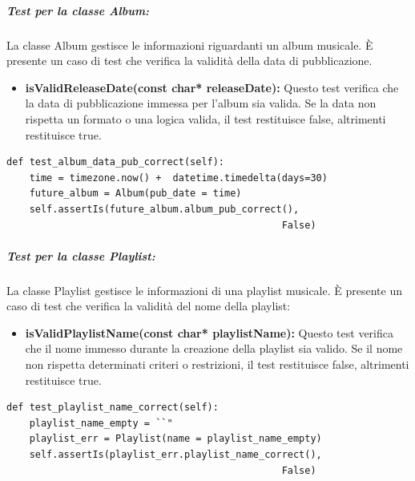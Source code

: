 \vspace{3pt}
\subparagraph{Test per la classe \textbf{Album:}} La classe Album gestisce le informazioni riguardanti un album musicale. È presente un caso di test che verifica la validità della data di pubblicazione.
\vspace{2pt}
\begin{itemize}
    \item \textbf{isValidReleaseDate(const char* releaseDate):}
    Questo test verifica che la data di pubblicazione immessa per l'album sia valida. Se la data non rispetta un formato o una logica valida, il test restituisce false, altrimenti restituisce true.
\end{itemize}

\vspace{2pt}
\begin{lstlisting}[caption={class AlbumModelTests(TestCase)}, captionpos=b]
def test_album_data_pub_correct(self):
    time = timezone.now() +  datetime.timedelta(days=30)
    future_album = Album(pub_date = time)
    self.assertIs(future_album.album_pub_correct(), 
                                                False)
\end{lstlisting} 


\newpage
\subparagraph{Test per la classe \textbf{Playlist:}} La classe Playlist gestisce le informazioni di una playlist musicale. È presente un caso di test che verifica la validità del nome della playlist:
\vspace{2pt}
\begin{itemize}
    \item \textbf{isValidPlaylistName(const char* playlistName):}
    Questo test verifica che il nome immesso durante la creazione della playlist sia valido. Se il nome non rispetta determinati criteri o restrizioni, il test restituisce false, altrimenti restituisce true.
\end{itemize}
\vspace{2pt}
\begin{lstlisting}[caption={PlaylistModelTests(TestCase)}, captionpos=b]
def test_playlist_name_correct(self):
    playlist_name_empty = ``"
    playlist_err = Playlist(name = playlist_name_empty)
    self.assertIs(playlist_err.playlist_name_correct(), 
                                                False)
\end{lstlisting} 

